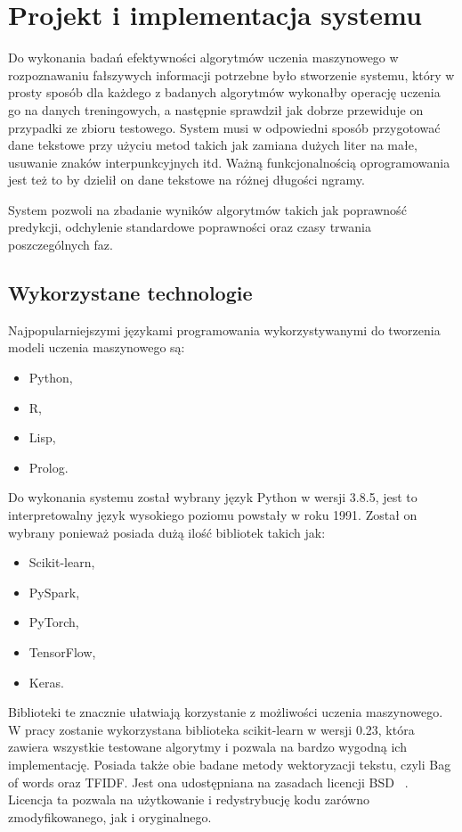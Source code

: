 \chapter{Projekt i implementacja systemu}
Do wykonania badań efektywności algorytmów uczenia maszynowego w rozpoznawaniu
fałszywych informacji potrzebne było stworzenie systemu, który w prosty sposób 
dla każdego z badanych algorytmów wykonałby operację uczenia go na danych treningowych,
a następnie sprawdził jak dobrze przewiduje on przypadki ze zbioru testowego.
System musi w odpowiedni sposób przygotować dane tekstowe przy użyciu metod takich jak zamiana dużych liter na małe, usuwanie znaków interpunkcyjnych itd.
Ważną funkcjonalnością oprogramowania jest też to by dzielił on dane tekstowe na 
różnej długości ngramy. 

System pozwoli na zbadanie wyników algorytmów takich jak poprawność predykcji,
odchylenie standardowe poprawności oraz czasy trwania poszczególnych faz.

\section{Wykorzystane technologie}
Najpopularniejszymi językami programowania wykorzystywanymi do tworzenia modeli uczenia
maszynowego są:
\begin{itemize}
    \item Python,
    \item R,
    \item Lisp,
    \item Prolog.
\end{itemize}
Do wykonania systemu został wybrany język Python w wersji 3.8.5, jest to interpretowalny
język wysokiego poziomu powstały w roku 1991. Został on wybrany 
ponieważ posiada dużą ilość bibliotek takich jak: 
\begin{itemize}
    \item Scikit-learn,
    \item PySpark,
    \item PyTorch,
    \item TensorFlow,
    \item Keras.
\end{itemize}
Biblioteki te znacznie ułatwiają korzystanie z możliwości uczenia maszynowego.
W pracy zostanie wykorzystana biblioteka scikit-learn w wersji 0.23, która zawiera wszystkie 
testowane algorytmy i pozwala na bardzo wygodną ich implementację. Posiada także obie 
badane metody wektoryzacji tekstu, czyli Bag of words oraz TFIDF. Jest ona udostępniana na zasadach licencji BSD ~\cite{scikitlearn}. 
Licencja ta pozwala na użytkowanie i redystrybucję kodu zarówno zmodyfikowanego, jak i oryginalnego.

